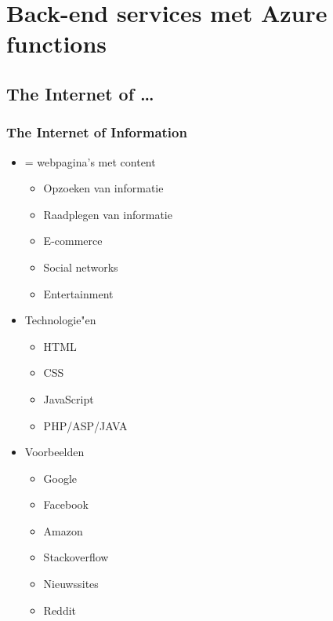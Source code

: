 \documentclass{article}
\begin{document}
\section{Back-end services met Azure functions}

\subsection{The Internet of \dots}

\subsubsection{The Internet of Information}
\begin{itemize}
    \item = webpagina’s met content
    \begin{itemize}
        \item Opzoeken van informatie
        \item Raadplegen van informatie
        \item E-commerce
        \item Social networks
        \item Entertainment
    \end{itemize}
    \item Technologie"en
    \begin{itemize}
        \item HTML
        \item CSS
        \item JavaScript
        \item PHP/ASP/JAVA
    \end{itemize}
    \item Voorbeelden
    \begin{itemize}
        \item Google
        \item Facebook
        \item Amazon
        \item Stackoverflow
        \item Nieuwssites
        \item Reddit
    \end{itemize}
\end{itemize}
\end{document}
